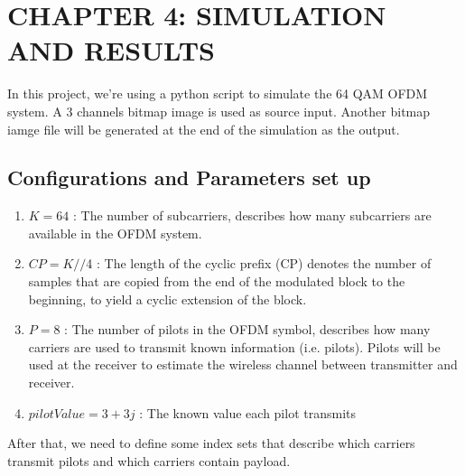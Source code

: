 \section*{CHAPTER 4: SIMULATION AND RESULTS}
\setcounter{section}{4}
\setcounter{subsection}{0}
\setcounter{figure}{0}
\setcounter{table}{0}

In this project, we're using a python script to simulate the 64 QAM OFDM system. A 3 channels bitmap image is used as source input. Another bitmap iamge file will be generated at the end of the simulation as the output.

\subsection{Configurations and Parameters set up}

\begin{enumerate}
    \item $K = 64$ : The number of subcarriers, describes how many subcarriers are available in the OFDM system.
    \item $CP = K//$4 : The length of the cyclic prefix (CP) denotes the number of samples that are copied from the end of the modulated block to the beginning, to yield a cyclic extension of the block.
    \item $P = 8$ : The number of pilots in the OFDM symbol, describes how many carriers are used to transmit known information (i.e. pilots). Pilots will be used at the receiver to estimate the wireless channel between transmitter and receiver.
    \item $pilotValue = 3+3j$ : The known value each pilot transmits
\end{enumerate}

After that, we need to define some index sets that describe which carriers transmit pilots and which carriers contain payload.

